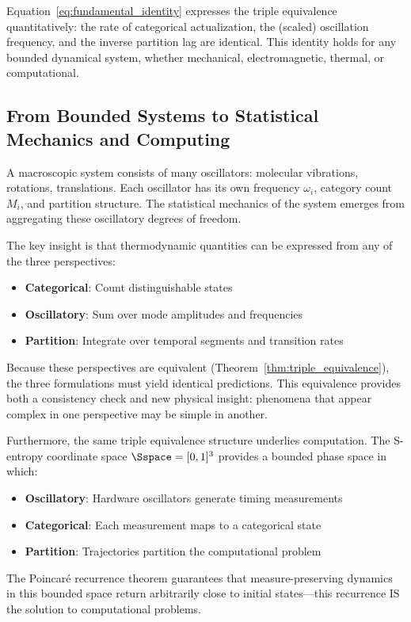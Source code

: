 Equation~\eqref{eq:fundamental_identity} expresses the triple equivalence quantitatively: the rate of categorical actualization, the (scaled) oscillation frequency, and the inverse partition lag are identical. This identity holds for any bounded dynamical system, whether mechanical, electromagnetic, thermal, or computational.

\subsection{From Bounded Systems to Statistical Mechanics and Computing}

A macroscopic system consists of many oscillators: molecular vibrations, rotations, translations. Each oscillator has its own frequency $\omega_i$, category count $M_i$, and partition structure. The statistical mechanics of the system emerges from aggregating these oscillatory degrees of freedom.

The key insight is that thermodynamic quantities can be expressed from any of the three perspectives:
\begin{itemize}
\item \textbf{Categorical}: Count distinguishable states
\item \textbf{Oscillatory}: Sum over mode amplitudes and frequencies
\item \textbf{Partition}: Integrate over temporal segments and transition rates
\end{itemize}

Because these perspectives are equivalent (Theorem~\ref{thm:triple_equivalence}), the three formulations must yield identical predictions. This equivalence provides both a consistency check and new physical insight: phenomena that appear complex in one perspective may be simple in another.

Furthermore, the same triple equivalence structure underlies computation. The S-entropy coordinate space $\Sspace = [0,1]^3$ provides a bounded phase space in which:
\begin{itemize}
\item \textbf{Oscillatory}: Hardware oscillators generate timing measurements
\item \textbf{Categorical}: Each measurement maps to a categorical state
\item \textbf{Partition}: Trajectories partition the computational problem
\end{itemize}

The Poincar\'e recurrence theorem guarantees that measure-preserving dynamics in this bounded space return arbitrarily close to initial states---this recurrence IS the solution to computational problems.

